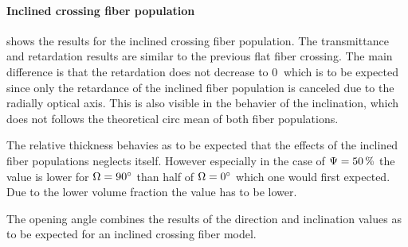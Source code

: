 \paragraph{Inclined crossing fiber population}
 shows the results for the inclined crossing fiber population.
The transmittance and retardation results are similar to the previous flat fiber crossing.
The main difference is that the retardation does not decrease to $\SI{0}{}$ which is to be expected since only the retardance of the inclined fiber population is canceled due to the radially optical axis.
This is also visible in the behavier of the inclination, which does not follows the theoretical circ mean of both fiber populations.
\par
% 
The relative thickness \trel{} behavies as to be expected that the effects of the inclined fiber populations neglects itself.
However especially in the case of $\textnormal{$\Psi$}=\SI{50}{\percent}$ the \trel{} value is lower for $\textnormal{$\Omega$}=\SI{90}{\degree}$ than half of $\textnormal{$\Omega$}=\SI{0}{\degree}$ which one would first expected.
Due to the lower volume fraction the \trel{} value has to be lower.
\par
%
The opening angle \openingAngle{} combines the results of the direction and inclination values as to be expected for an inclined crossing fiber model.
% 
%
%
